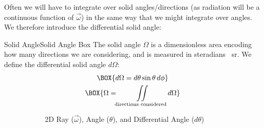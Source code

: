 Often we will have to integrate over solid angles/directions (as radiation will be a continuous function of $\vec{\omega}$) in the same way that we might integrate over angles. We therefore introduce the differential solid angle:

\begin{fact}{Solid Angle}{Solid Angle Box}\label{Solid Angle Box}
    The solid angle $\Omega$ is a dimensionless area encoding how many directions we are considering, and is measured in steradians \qty{}{\steradian}. We define the differential solid angle $d\Omega$:
    \begin{gather}
        \BOX{d\Omega=d\theta \sin\theta \,d\phi}\\
        \BOX{\Omega = \iint\displaylimits_\text{directions considered} d\Omega}
    \end{gather}
    \begin{figure}[H]
        \centering
        \begin{subfigure}{0.4\linewidth}
            \centering
            \caption{2D Ray ($\vec{\omega}$), Angle ($\theta$), and Differential Angle ($d\theta$)}
            \label{2D Ray}
        \end{subfigure}
        \qquad
        \begin{subfigure}{0.4\linewidth}
            \centering
            \scalebox{1.4}{
            \begin{tikzpicture},

\end{tikzpicture}}
\end{subfigure}
\end{figure}
\end{fact}
